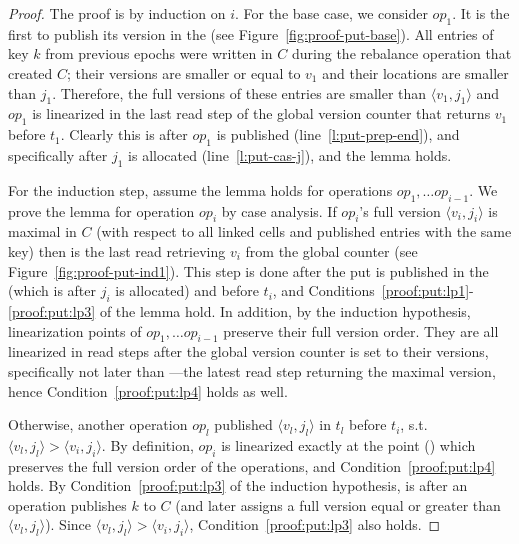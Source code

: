 \begin{proof}
The proof is by induction on $i$. For the base case, we consider $op_1$. It is the first to publish its version in the   (see Figure~\ref{fig:proof-put-base}). 
All entries of key $k$ from previous epochs were written in $C$ during the rebalance operation that created $C$; their versions are smaller or equal to $v_1$ and their locations are smaller than $j_1$. 
Therefore, the full versions of these entries are smaller than $\langle v_1, j_1\rangle$  and $op_1$ is linearized in the last read step of the global version counter that returns $v_1$ before $t_1$. Clearly this is after $op_1$ is published (line~\ref{l:put-prep-end}), and specifically after $j_1$ is allocated (line~\ref{l:put-cas-j}), and the lemma holds.

For the induction step, assume the lemma holds for operations $op_1, \ldots op_{i-1}$. We prove the lemma for operation $op_i$ by case analysis.
If $op_i$'s full version $\langle v_i, j_i\rangle$ is maximal in $C$ (with respect to all linked cells and published entries with the same key) then  is the last read retrieving $v_i$ from the global counter  (see Figure~\ref{fig:proof-put-ind1}). This step is done after the put is published in the  (which is after $j_i$ is allocated) and before $t_i$, and Conditions~\ref{proof:put:lp1}-\ref{proof:put:lp3} of the lemma hold. In addition, by the induction hypothesis, linearization points of $op_1, \ldots op_{i-1}$ preserve their full version order. They are all linearized in read steps after the global version counter is set to their versions, specifically not later than ---the latest read step returning the maximal version, hence Condition~\ref{proof:put:lp4} holds as well.

Otherwise, another operation $op_l$ published $\langle v_l, j_l\rangle$ in $t_l$ before $t_i$, s.t. $\langle v_l, j_l\rangle > \langle v_i, j_i\rangle$. By definition, $op_i$ is linearized exactly at the point () which preserves the full version order of the operations, and Condition~\ref{proof:put:lp4} holds. By Condition~\ref{proof:put:lp3} of the induction hypothesis,  is after an operation publishes $k$ to $C$ (and later assigns a full version equal or greater than $\langle v_l, j_l\rangle$). Since $\langle v_l, j_l\rangle > \langle v_i, j_i\rangle$, Condition~\ref{proof:put:lp3} also holds. 


\end{proof}

